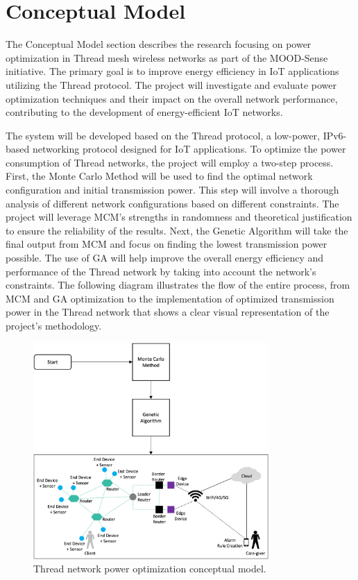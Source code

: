 \chapter{Conceptual Model}\label{chap:conceptual_model}

The Conceptual Model section describes the research focusing on power optimization in Thread mesh wireless networks as part of the MOOD-Sense initiative. The primary goal is to improve energy efficiency in IoT applications utilizing the Thread protocol. The project will investigate and evaluate power optimization techniques and their impact on the overall network performance, contributing to the development of energy-efficient IoT networks.

The system will be developed based on the Thread protocol, a low-power, IPv6-based networking protocol designed for IoT applications. To optimize the power consumption of Thread networks, the project will employ a two-step process. First, the Monte Carlo Method will be used to find the optimal network configuration and initial transmission power. This step will involve a thorough analysis of different network configurations based on different constraints. The project will leverage MCM's strengths in randomness and theoretical justification to ensure the reliability of the results. Next, the Genetic Algorithm will take the final output from MCM and focus on finding the lowest transmission power possible. The use of GA will help improve the overall energy efficiency and performance of the Thread network by taking into account the network's constraints. The following diagram illustrates the flow of the entire process, from MCM and GA optimization to the implementation of optimized transmission power in the Thread network that shows a clear visual representation of the project's methodology.

\begin{figure}[H]
    \centering
    \includegraphics[width=0.8\textwidth]{images/conceptual_model/Thread_Network_Power_Optimization_Conceptual_Model.png}
    \caption{Thread network power optimization conceptual model.}
    \label{fig:conceptual_model}
\end{figure}

